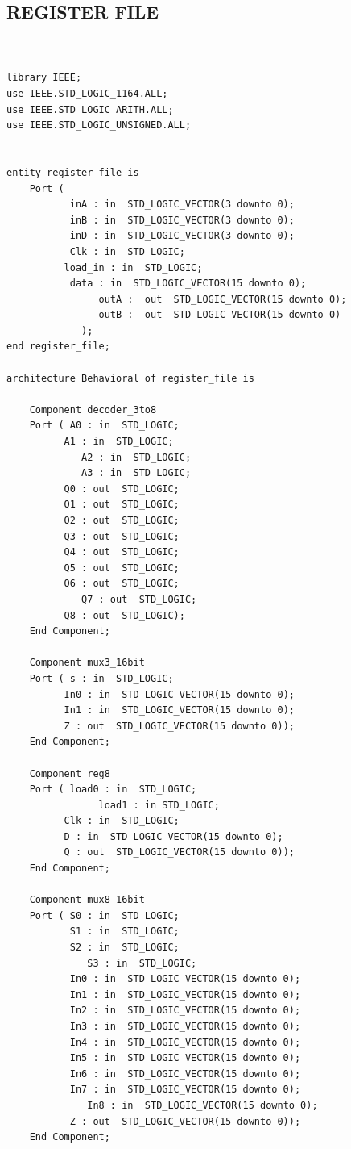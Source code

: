 \documentclass{article}
\begin{document}
\subsection{REGISTER FILE}\label{sec:intro}

\begin{lstlisting}


library IEEE;
use IEEE.STD_LOGIC_1164.ALL;
use IEEE.STD_LOGIC_ARITH.ALL;
use IEEE.STD_LOGIC_UNSIGNED.ALL;


entity register_file is
    Port ( 
           inA : in  STD_LOGIC_VECTOR(3 downto 0);
           inB : in  STD_LOGIC_VECTOR(3 downto 0);
           inD : in  STD_LOGIC_VECTOR(3 downto 0);
           Clk : in  STD_LOGIC;
          load_in : in  STD_LOGIC;
           data : in  STD_LOGIC_VECTOR(15 downto 0);
				outA :  out  STD_LOGIC_VECTOR(15 downto 0);
				outB :  out  STD_LOGIC_VECTOR(15 downto 0)
			 );
end register_file;

architecture Behavioral of register_file is

	Component decoder_3to8
	Port ( A0 : in  STD_LOGIC;
          A1 : in  STD_LOGIC;
			 A2 : in  STD_LOGIC;
			 A3 : in  STD_LOGIC;
          Q0 : out  STD_LOGIC;
          Q1 : out  STD_LOGIC;
          Q2 : out  STD_LOGIC;
          Q3 : out  STD_LOGIC;
          Q4 : out  STD_LOGIC;
          Q5 : out  STD_LOGIC;
          Q6 : out  STD_LOGIC;
			 Q7 : out  STD_LOGIC;
          Q8 : out  STD_LOGIC);
	End Component;

	Component mux3_16bit
	Port ( s : in  STD_LOGIC;
          In0 : in  STD_LOGIC_VECTOR(15 downto 0);
          In1 : in  STD_LOGIC_VECTOR(15 downto 0);
          Z : out  STD_LOGIC_VECTOR(15 downto 0));
	End Component;
	
	Component reg8
	Port ( load0 : in  STD_LOGIC;
				load1 : in STD_LOGIC;
          Clk : in  STD_LOGIC;
          D : in  STD_LOGIC_VECTOR(15 downto 0);
          Q : out  STD_LOGIC_VECTOR(15 downto 0));
	End Component;
	
	Component mux8_16bit
	Port ( S0 : in  STD_LOGIC;
           S1 : in  STD_LOGIC;
           S2 : in  STD_LOGIC;
			  S3 : in  STD_LOGIC;
           In0 : in  STD_LOGIC_VECTOR(15 downto 0);
           In1 : in  STD_LOGIC_VECTOR(15 downto 0);
           In2 : in  STD_LOGIC_VECTOR(15 downto 0);
           In3 : in  STD_LOGIC_VECTOR(15 downto 0);
           In4 : in  STD_LOGIC_VECTOR(15 downto 0);
           In5 : in  STD_LOGIC_VECTOR(15 downto 0);
           In6 : in  STD_LOGIC_VECTOR(15 downto 0);
           In7 : in  STD_LOGIC_VECTOR(15 downto 0);
			  In8 : in  STD_LOGIC_VECTOR(15 downto 0);
           Z : out  STD_LOGIC_VECTOR(15 downto 0));
	End Component;
	

\end{lstlisting}
\end{document}
